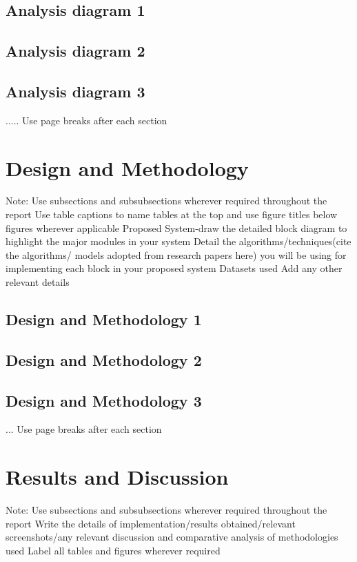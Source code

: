 \documentclass[12pt,singleside,a4paper]{article}
\begin{document}
\subsection{Analysis diagram 1}
\subsection{Analysis diagram 2}
\subsection{Analysis diagram 3}
.....
\newline Use page breaks after each section
\section{Design and Methodology}
 Note: Use subsections and subsubsections wherever required throughout the report
\newline Use table captions to name tables at the top and use figure titles below figures wherever applicable 
\newline Proposed System-draw the detailed block diagram to highlight the major modules in your system 
\newline Detail the algorithms/techniques(cite the algorithms/ models adopted from research papers here) you will be using for implementing each block in your proposed system
\newline Datasets used
\newline Add any other relevant details
\subsection{Design and Methodology 1}
\subsection{Design and Methodology 2}
\subsection{Design and Methodology 3}
...
\newline Use page breaks after each section
\section{Results and Discussion}
 Note: Use subsections and subsubsections wherever required throughout the report
\newline Write the details of implementation/results obtained/relevant screenshots/any relevant discussion and comparative analysis of methodologies used
Label all tables and figures wherever required
\end{document}
